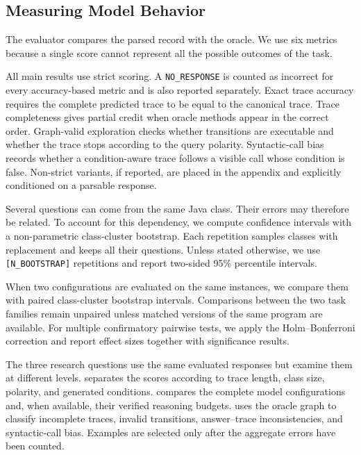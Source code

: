 \subsection{Measuring Model Behavior}
\label{subsec:scoring}
\label{subsec:statistical-analysis}

The evaluator compares the parsed record with the oracle. We use six metrics because a single score cannot represent all the possible outcomes of the task.



All main results use strict scoring. A \texttt{NO\_RESPONSE} is counted as incorrect for every accuracy-based metric and is also reported separately. Exact trace accuracy requires the complete predicted trace to be equal to the canonical trace. Trace completeness gives partial credit when oracle methods appear in the correct order. Graph-valid exploration checks whether transitions are executable and whether the trace stops according to the query polarity. Syntactic-call bias records whether a condition-aware trace follows a visible call whose condition is false. Non-strict variants, if reported, are placed in the appendix and explicitly conditioned on a parsable response.

Several questions can come from the same Java class. Their errors may therefore be related. To account for this dependency, we compute confidence intervals with a non-parametric class-cluster bootstrap. Each repetition samples classes with replacement and keeps all their questions. Unless stated otherwise, we use \texttt{[N\_BOOTSTRAP]} repetitions and report two-sided 95\% percentile intervals.

When two configurations are evaluated on the same instances, we compare them with paired class-cluster bootstrap intervals. Comparisons between the two task families remain unpaired unless matched versions of the same program are available. For multiple confirmatory pairwise tests, we apply the Holm--Bonferroni correction and report effect sizes together with significance results.

The three research questions use the same evaluated responses but examine them at different levels.  separates the scores according to trace length, class size, polarity, and generated conditions.  compares the complete model configurations and, when available, their verified reasoning budgets.  uses the oracle graph to classify incomplete traces, invalid transitions, answer--trace inconsistencies, and syntactic-call bias. Examples are selected only after the aggregate errors have been counted.

